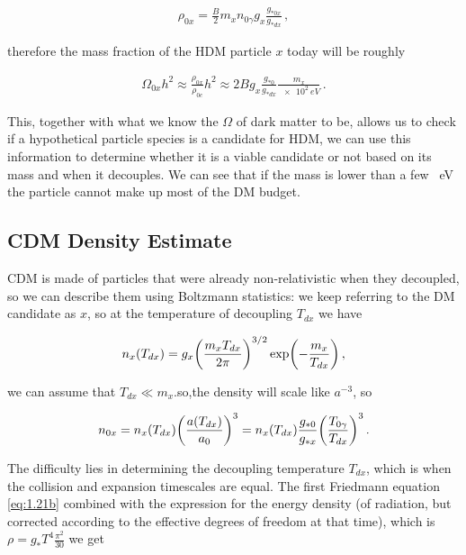 \begin{align}
  \rho_{0x} = \frac{B}{2} m_x n_{0 \gamma } g_x \frac{g_{*0x}}{g_{*dx}}
\,,
\end{align}

therefore the mass fraction of the HDM particle \(x\) today will be roughly

\begin{align}
    \Omega_{0x} h^2 \approx \frac{\rho_{0x}}{\rho_{0c}} h^2 \approx 2B g_x \frac{g_{*0}}{g_{*dx}} \frac{m_x}{\SI{e2}{eV}}\,.
\end{align}

\hspace{0.5cm}This, together with what we know the \(\Omega\) of dark matter to be, allows us to check if a hypothetical particle species is a candidate for HDM, we can use this information to determine whether it is a viable candidate or not based on its mass and when it decouples.
We can see that if the mass is lower than a few \SI{}{eV} the particle cannot make up most of the DM budget.
 


\subsection{CDM Density Estimate}

\hspace{0.5cm}CDM is made of particles that were already non-relativistic when they decoupled, so we can describe them using Boltzmann statistics: we keep referring to the DM candidate as \(x\), so at the temperature of decoupling \(T_{dx}\) we have

\begin{align}
    n_x (T_{dx}) = g_{x} \qty(\frac{m_x T_{dx}}{2 \pi })^{3/2} \exp(- \frac{m_x}{T_{dx}}) \,,
\end{align}

\hspace{0.5cm}we can assume that \(T_{dx} \ll m_x\).so,the density will scale like \(a^{-3}\), so 

\begin{align}
      n_{0x} = n_x (T_{dx}) \qty(\frac{a(T_{dx})}{a_0 })^3 = n_x(T_{dx}) \frac{g_{*0}}{g_{*x}} \qty(\frac{T_{0 \gamma }}{T_{dx}})^3 \,.
\end{align}

The difficulty lies in determining the decoupling temperature \(T_{dx}\), which is when the collision and expansion timescales are equal. 
\hspace{0.5cm}\hspace{0.5cm}The first Friedmann equation \ref{eq:1.21b} combined with the expression for the energy density (of radiation, but corrected according to the effective degrees of freedom at that time), which is \( \rho = g_* T^4\frac{\pi^2}{30}\) we get

